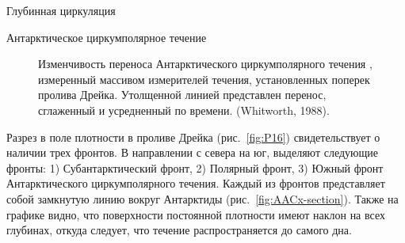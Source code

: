 \begin{chapter}{Глубинная циркуляция}
\begin{section}{Антарктическое циркумполярное течение}
\begin{figure}[b!]
\caption{Изменчивость переноса%
Антарктического циркумполярного течения%
, измеренный массивом
измерителей течения, установленных поперек пролива Дрейка. 
Утолщенной линией представлен перенос, сглаженный и усредненный по времени.
(Whitworth, 1988).}
\label{fig:aacxport}
\end{figure}
%
%

Разрез в поле плотности в проливе Дрейка (рис.~\ref{fig:P16})
свидетельствует о наличии трех фронтов. В направлении с севера на юг, 
выделяют следующие фронты: 1) Субантарктический фронт, 
2) Полярный фронт, 3) Южный фронт Антарктического циркумполярного течения. 
Каждый из фронтов представляет собой замкнутую линию вокруг Антарктиды
(рис.~\ref{fig:AACx-section}). Также на графике видно, что поверхности 
постоянной плотности имеют наклон на всех глубинах, откуда следует,
что течение распространяется до самого дна.
%


\end{section}
\end{chapter}
